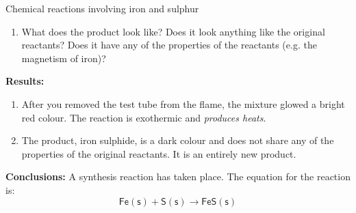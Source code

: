 \begin{g_experiment}{Chemical reactions involving iron and sulphur }
\begin{enumerate}[noitemsep, label=\textbf{\arabic*}. ]
\label{m38709*uid24}\item What does the product look like? Does it look anything like the original reactants? Does it have any of the properties of the reactants (e.g. the magnetism of iron)?
\end{enumerate}
        \par 
        \label{m38709*eip-963}
	\par
      \label{m38709*id63554}\noindent{}\textbf{Results:}
          \newline
        \label{m38709*id63560}\begin{enumerate}[noitemsep, label=\textbf{\arabic*}. ] 
            \label{m38709*uid25}\item After you removed the test tube from the flame, the mixture glowed a bright red colour. The reaction is exothermic and \textsl{produces heats}.
\label{m38709*uid26}\item The product, iron sulphide, is a dark colour and does not share any of the properties of the original reactants. It is an entirely new product.
\end{enumerate}
        \par 
        \label{m38709*id63594}\noindent{}\textbf{Conclusions:}
          \newline
A synthesis reaction has taken place. The equation for the reaction is:
        \label{m38709*id63604}\nopagebreak\noindent{}
    \begin{equation*}
    \mathsf{Fe (s)}+\mathsf{S (s)}\to \mathsf{FeS (s)}
      \end{equation*}
    \par 
\end{g_experiment}
    \label{m38711*cid4}
